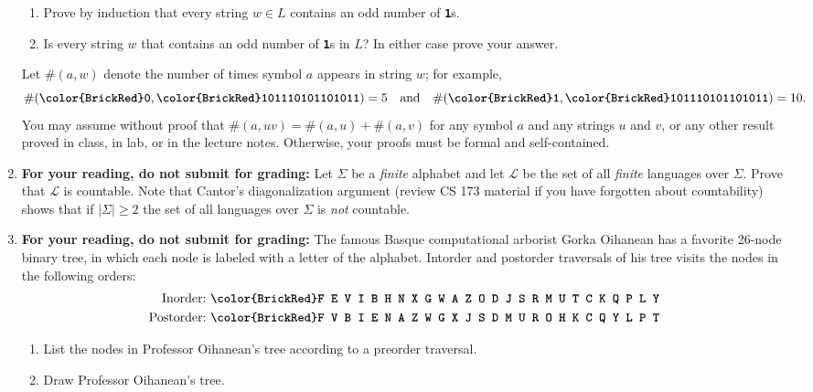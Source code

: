 \documentclass[11pt]{article}
\def\Sym#1{\textbf{\texttt{\color{BrickRed}#1}}}
\begin{document}
\begin{enumerate}
\begin{enumerate}
\item Prove by induction that every string $w \in L$ contains an odd
  number of \Sym1s.
\item
Is every string $w$ that contains an odd number of \Sym1s in $L$?
In either case prove your answer.
\end{enumerate}
Let $\#(a, w)$ denote the number of times symbol $a$ appears in string $w$; for example,
\[
	\#(\Sym0, \Sym{101110101101011}) = 5
	\quad\text{and}\quad
	\#(\Sym1, \Sym{101110101101011}) = 10.
\]
You may assume without proof that $\#(a, uv) = \#(a, u) + \#(a, v)$ for any symbol $a$ and any strings $u$ and $v$, or any other result proved in class, in lab, or in the lecture notes.  Otherwise, your proofs must be formal and self-contained.

\item {\bf For your reading, do not submit for grading:} Let $\Sigma$ be a \emph{finite} alphabet
and let $\mathcal{L}$ be the set of all {\em finite} languages over $\Sigma$.
Prove that $\mathcal{L}$ is countable. Note that Cantor's diagonalization
argument (review CS 173 material if you have forgotten about countability) shows
that if $|\Sigma| \ge 2$ the set of all languages over $\Sigma$ is 
\emph{not} countable.

\item {\bf For your reading, do not submit for grading:} 
The famous Basque computational arborist Gorka Oihanean has a favorite 26-node binary tree, in which each node is labeled with a letter of the alphabet.  Intorder and postorder traversals of his tree visits the nodes in the following orders:
\begin{align*}
	\text{Inorder:~}	& \Sym{F E V I B H N X G W A Z O D J S R M U T C K Q P L Y} \\
	\text{Postorder:~}	& \Sym{F V B I E N A Z W G X J S D M U R O H K C Q Y L P T}
\end{align*}

\begin{enumerate}
\item
List the nodes in Professor Oihanean’s tree according to a preorder traversal.

\item
Draw Professor Oihanean’s tree.

\end{enumerate}

\end{enumerate}

\newpage
\end{document}

